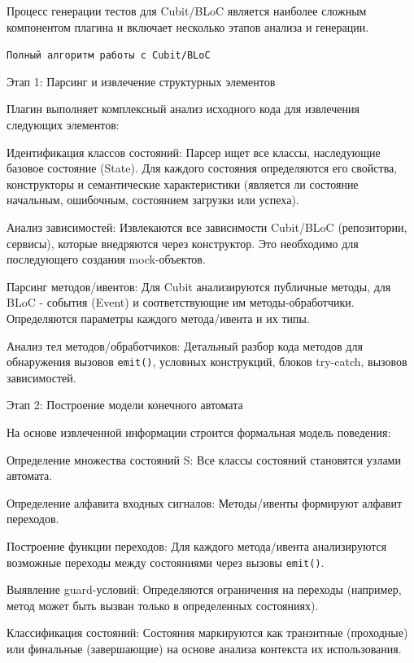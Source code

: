 \documentclass[14pt, russian]{scrartcl}
\begin{document}
Процесс генерации тестов для Cubit/BLoC является наиболее сложным компонентом плагина и включает несколько этапов анализа и генерации.

\texttt{Полный алгоритм работы с Cubit/BLoC}

Этап 1: Парсинг и извлечение структурных элементов

Плагин выполняет комплексный анализ исходного кода для извлечения следующих элементов:
\begin{itemize*}
    \item Идентификация классов состояний: Парсер ищет все классы, наследующие базовое состояние (State). Для каждого состояния определяются его свойства, конструкторы и семантические характеристики (является ли состояние начальным, ошибочным, состоянием загрузки или успеха).
    \item Анализ зависимостей: Извлекаются все зависимости Cubit/BLoC (репозитории, сервисы), которые внедряются через конструктор. Это необходимо для последующего создания mock-объектов.
    \item Парсинг методов/ивентов: Для Cubit анализируются публичные методы, для BLoC - события (Event) и соответствующие им методы-обработчики. Определяются параметры каждого метода/ивента и их типы.
    \item Анализ тел методов/обработчиков: Детальный разбор кода методов для обнаружения вызовов \texttt{emit()}, условных конструкций, блоков try-catch, вызовов зависимостей.
\end{itemize*}

Этап 2: Построение модели конечного автомата

На основе извлеченной информации строится формальная модель поведения:
\begin{itemize*}
    \item Определение множества состояний S: Все классы состояний становятся узлами автомата.
    \item Определение алфавита входных сигналов: Методы/ивенты формируют алфавит переходов.
    \item Построение функции переходов: Для каждого метода/ивента анализируются возможные переходы между состояниями через вызовы \texttt{emit()}.
    \item Выявление guard-условий: Определяются ограничения на переходы (например, метод может быть вызван только в определенных состояниях).
    \item Классификация состояний: Состояния маркируются как транзитные (проходные) или финальные (завершающие) на основе анализа контекста их использования.
\end{itemize*}
\end{document}
